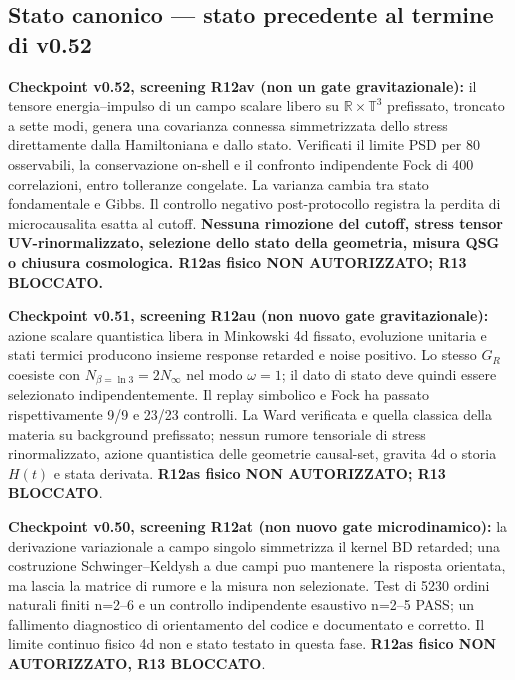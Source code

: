 \documentclass[11pt,a4paper]{article}
\begin{document}
\subsection*{Stato canonico — stato precedente al termine di v0.52}
\textbf{Checkpoint v0.52, screening R12av (non un gate gravitazionale):} il tensore energia--impulso di un campo scalare libero su $\mathbb R\times\mathbb T^3$ prefissato, troncato a sette modi, genera una covarianza connessa simmetrizzata dello stress direttamente dalla Hamiltoniana e dallo stato. Verificati il limite PSD per 80 osservabili, la conservazione on-shell e il confronto indipendente Fock di 400 correlazioni, entro tolleranze congelate. La varianza cambia tra stato fondamentale e Gibbs. Il controllo negativo post-protocollo registra la perdita di microcausalita esatta al cutoff. \textbf{Nessuna rimozione del cutoff, stress tensor UV-rinormalizzato, selezione dello stato della geometria, misura QSG o chiusura cosmologica. R12as fisico NON AUTORIZZATO; R13 BLOCCATO.}\par\medskip

\textbf{Checkpoint v0.51, screening R12au (non nuovo gate gravitazionale):} azione scalare quantistica libera in Minkowski 4d fissato, evoluzione unitaria e stati termici producono insieme response retarded e noise positivo. Lo stesso $G_R$ coesiste con $N_{\beta=\ln3}=2N_{\infty}$ nel modo $\omega=1$; il dato di stato deve quindi essere selezionato indipendentemente. Il replay simbolico e Fock ha passato rispettivamente 9/9 e 23/23 controlli. La Ward verificata e quella classica della materia su background prefissato; nessun rumore tensoriale di stress rinormalizzato, azione quantistica delle geometrie causal-set, gravita 4d o storia $H(t)$ e stata derivata. \textbf{R12as fisico NON AUTORIZZATO; R13 BLOCCATO}.\par\medskip


\textbf{Checkpoint v0.50, screening R12at (non nuovo gate microdinamico):}
la derivazione variazionale a campo singolo simmetrizza il kernel BD retarded;
una costruzione Schwinger--Keldysh a due campi puo mantenere la risposta orientata,
ma lascia la matrice di rumore e la misura non selezionate. Test di 5230 ordini
naturali finiti n=2--6 e un controllo indipendente esaustivo n=2--5 PASS;
un fallimento diagnostico di orientamento del codice e documentato e corretto.
Il limite continuo fisico 4d non e stato testato in questa fase. 
\textbf{R12as fisico NON AUTORIZZATO, R13 BLOCCATO}.\par\medskip
\end{document}
